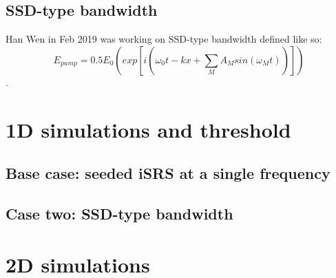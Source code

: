 \subsection{SSD-type bandwidth}
 Han Wen in Feb 2019 was working on SSD-type bandwidth defined like so:
 $$E_{pump} = 0.5E_0\left(exp[i(\omega_0t-kx+\sum_MA_Msin(\omega_Mt))]\right)$$.



\section{1D simulations and threshold}
\subsection{Base case: seeded iSRS at a single frequency}
\subsection{Case two: SSD-type bandwidth}
\section{2D simulations}





